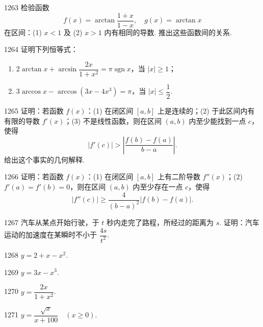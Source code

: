 \begin{prob}[M]{1263}
检验函数
\[
f(x) = \arctan \frac{1 + x}{1 - x}, \quad g(x) = \arctan x
\]
在区间：(1) $x < 1$ 及 (2) $x > 1$ 内有相同的导数. 推出这些函数间的关系.
\end{prob}

\begin{prob}[M]{1264}
证明下列恒等式：
\begin{enumerate}[label=(\alph*), itemsep=2pt, topsep=3pt]
\item $2\arctan x + \arcsin \dfrac{2x}{1 + x^2} = \pi \operatorname{sgn} x$，当 $|x| \geqslant 1$；
\item $3\arccos x - \arccos(3x - 4x^3) = \pi$，当 $|x| \leqslant \dfrac{1}{2}$.
\end{enumerate}
\end{prob}

\begin{prob}[M]{1265}
证明：若函数 $f(x)$：(1) 在闭区间 $[a, b]$ 上是连续的；(2) 于此区间内有有限的导数 $f'(x)$；(3) 不是线性函数，则在区间 $(a, b)$ 内至少能找到一点 $c$，使得
\[
|f'(c)| > \left|\frac{f(b) - f(a)}{b - a}\right|.
\]
给出这个事实的几何解释.
\end{prob}

\begin{prob}[M]{1266}
证明：若函数 $f(x)$：(1) 在闭区间 $[a, b]$ 上有二阶导数 $f''(x)$；(2) $f'(a) = f'(b) = 0$，则在区间 $(a, b)$ 内至少存在一点 $c$，使得
\[
|f''(c)| \geqslant \frac{4}{(b - a)^2}|f(b) - f(a)|.
\]
\end{prob}

\begin{prob}[M]{1267}
汽车从某点开始行驶，于 $t$ 秒内走完了路程，所经过的距离为 $s$. 证明：汽车运动的加速度在某瞬时不小于 $\dfrac{4s}{t^2}$.
\end{prob}



\begin{prob}[S]{1268}
$y = 2 + x - x^2$.
\end{prob}

\begin{prob}[S]{1269}
$y = 3x - x^3$.
\end{prob}

\begin{prob}[S]{1270}
$y = \dfrac{2x}{1 + x^2}$.
\end{prob}

\begin{prob}[S]{1271}
$y = \dfrac{\sqrt{x}}{x + 100} \quad (x \geqslant 0)$.
\end{prob}

